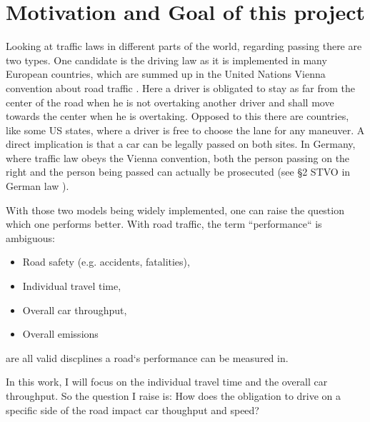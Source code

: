 \section{Motivation and Goal of this project}
\label{sec:goal}
Looking at traffic laws in different parts of the world, regarding passing there are two types. One candidate
is the driving law as it is implemented in many European countries, which are summed up in the United
Nations Vienna convention about road traffic \cite{vienna-treaty}. Here a driver is obligated to stay as far from the
center of the road when he is not overtaking another driver and shall move towards the center when he is overtaking.
Opposed to this there are countries, like some US states, where a driver is free to choose the lane for any maneuver.
A direct implication is that a car can be legally passed on both sites. In Germany, where traffic law obeys the Vienna
convention, both the person passing on the right and the person being passed can actually be prosecuted (see §2 STVO in 
German law \cite{STVO2}).

With those two models being widely implemented, one can raise the question which one performs better. With road traffic, the
term ``performance`` is ambiguous:
\begin{itemize}
  \item Road safety (e.g. accidents, fatalities),
  \item Individual travel time,
  \item Overall car throughput,
  \item Overall emissions
\end{itemize}
are all valid discplines a road`s performance can be measured in.

In this work, I will focus on the individual travel time and the overall car throughput. So the question I raise is:
\newline
How does the obligation to drive on a specific side of the road impact car thoughput and speed?

